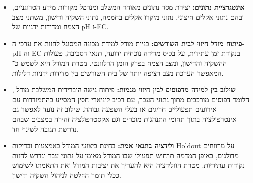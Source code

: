 \begin{itemize}
    \item \textbf{אינטגרציית נתונים:} יצירת מסד נתונים מאוחד  המשלב ומנרמל מקורות מידע הטרוגניים, ובהם נתוני אקלים חיצוני, נתוני מיקרו-אקלים בחממה, נתוני השקיה ודישון, משתני מצב הצמח ומדידות ידניות של pH ו-EC.
    \item \textbf{פיתוח מודל חיזוי לבית השורשים:} בניית מודל למידת מכונה המסוגל לחזות את ערכי ה-pH וה-EC בנקודת זמן עתידית, על בסיס מדידה נוכחית ידועה, תנאי הסביבה, פעולות ההשקיה והדישון, ומצב הצמח בפרק הזמן הרלוונטי. מטרת המודל היא לשמש כ־\SoftSensor{} המאפשר הערכת מצב רציפה יותר של בית השורשים בין מדידות ידניות דלילות.
    \item \textbf{שילוב בין למידה מדפוסים לבין חיזוי מגמות:} פיתוח גישה היברידית המשלבת מודל \GB{}, הלומד דפוסים מורכבים מתוך נתוני העבר, עם רכיב ליניארי חסין המסייע בהתמודדות עם אירועים תפעוליים חריגים או בעלי השפעה גבוהה. שילוב זה נועד לאפשר גם אינטרפולציה בתוך תחומי התנהגות מוכרים וגם אקסטרפולציה זהירה במצבים שבהם נדרשת תגובה לשינוי חד.
    \item \textbf{ולידציה בתנאי אמת:} בחינת ביצועי המודל באמצעות \WFV{} ובדיקות Holdout על מרווחים מדולגים, באופן המדמה תרחיש תפעולי שבו המודל מאומן על נתוני עבר ונדרש לחזות נקודות עתידיות. מטרת הוולידציה היא להעריך את יציבות המודל ואת התאמתו לשימוש ככלי תומך החלטה לניהול השקיה ודישון.
\end{itemize}
